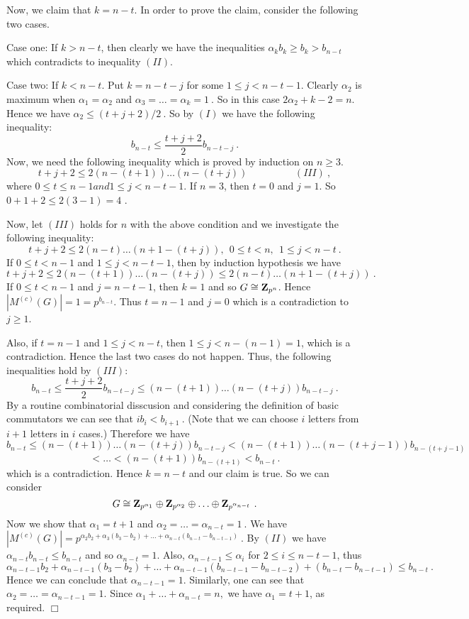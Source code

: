 Now, we claim that $k=n-t$. In order to prove the claim, consider the following two cases.

Case one: If $k>n-t$, then clearly we have the inequalities $\alpha_kb_k\geq b_k>b_{n-t}$ which contradicts to inequality $(II)$.

Case two: If $k<n-t$. Put $k=n-t-j$ for some $1\leq j<n-t-1$. Clearly $\alpha_2$ is maximum when $\alpha_1=\alpha_2$ and $\alpha_3=\ldots=\alpha_k=1\ .$ So in this case $2\alpha_2+k-2=n$. Hence we have $\alpha_2\leq(t+j+2)/2\ .$ So by $(I)$ we have the following inequality:
$$b_{n-t}\leq\frac{t+j+2}{2}b_{n-t-j}\ .$$
Now, we need the following inequality which is proved by induction on $n\geq 3$.
$$t+j+2\leq 2(n-(t+1))\ldots(n-(t+j))\hspace{2cm} (III)\ ,$$
where $0\leq t\leq n-1 and 1\leq j<n-t-1 .$ If $n=3$, then $t=0$ and $j=1$. So $0+1+2\leq 2(3-1)=4$ .

Now, let $(III)$ holds for $n$ with the above condition and we investigate the following inequality:
$$t+j+2\leq 2(n-t)\ldots(n+1-(t+j)),\ \ 0\leq t<n,\ \ 1\leq j<n-t\ .$$
 If $0\leq t<n-1$ and $1\leq j<n-t-1$, then by induction hypothesis we have
$$t+j+2\leq 2(n-(t+1))\ldots(n-(t+j))\leq 2(n-t)\ldots(n+1-(t+j))\ .$$
 If $0\leq t<n-1$ and $j=n-t-1$, then $k=1$ and so $G\cong{\bf Z}_{p^n}$. Hence $|M^{(c)}(G)|=1=p^{b_{n-t}}$. Thus $t=n-1$ and $j=0$ which is a contradiction to $j\geq 1$.

Also, if $t=n-1$ and $1\leq j<n-t$, then $1\leq j<n-(n-1)=1$, which is a contradiction. Hence the last two cases do not happen. Thus, the following inequalities hold by $(III)$:
$$b_{n-t}\leq\frac{t+j+2}{2}b_{n-t-j}\leq (n-(t+1))\ldots(n-(t+j))b_{n-t-j} \ .$$
By a routine combinatorial disscusion and considering the definition of basic
commutators we can see that $ib_i<b_{i+1}\ .$ (Note that we can choose $i$
letters from $i+1$ letters in $i$ cases.) Therefore we have
$$b_{n-t}\leq(n-(t+1))\ldots(n-(t+j))b_{n-t-j}<(n-(t+1))\ldots(n-(t+j-1))b_{n-(t+j-1)}$$
$$<\ldots <(n-(t+1))b_{n-(t+1)}< b_{n-t} \ .$$
which is a contradiction. Hence $k=n-t$ and our claim is true. So we can consider
$$G\cong{\bf Z}_{p^{\alpha_1}}\oplus{\bf Z}_{p^{\alpha_2}}\oplus\ldots\oplus{\bf Z}_{p^{\alpha_{n-t}}}\ .$$
 Now we show that $\alpha_1=t+1$ and $\alpha_2=\ldots=\alpha_{n-t}=1\ .$ We have $|M^{(c)}(G)|=p^{\alpha_2b_2+\alpha_3(b_3-b_2)+\ldots+\alpha_{n-t}(b_{n-t}-b_{n-t-1})}\ .$ By $(II)$ we have $\alpha_{n-t}b_{n-t}\leq b_{n-t}$ and so $\alpha_{n-t}=1$. Also, $\alpha_{n-t-1}\leq \alpha_i$ for $2\leq i\leq n-t-1$, thus
$$\alpha_{n-t-1}b_2+\alpha_{n-t-1}(b_3-b_2)+\ldots+\alpha_{n-t-1}(b_{n-t-1}-b_{n-t-2})+(b_{n-t}-b_{n-t-1})\leq b_{n-t}\ .$$
Hence we can conclude that $\alpha_{n-t-1}=1$. Similarly, one can see that  $\alpha_2=\ldots=\alpha_{n-t-1}=1.$ Since $\alpha_1+\ldots+\alpha_{n-t}=n,$ we have $\alpha_1=t+1$, as required. $\Box$\\

